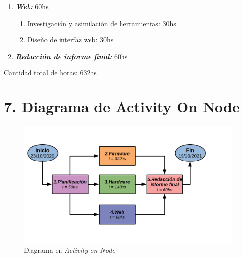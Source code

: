 \documentclass[11pt]{charter}
\begin{document}
\begin{enumerate}
	 \item \textbf{\textit{Web:}} 60hs
	 \begin{enumerate}
	 	\item Investigación y asimilación de herramientas: 30hs
	 	\item Diseño de interfaz web: 30hs
	 \end{enumerate}
	 
	 \item \textbf{\textit{Redacción de informe final:}} 60hs
\end{enumerate}

Cantidad total de horas: 632hs

\clearpage

\section{7. Diagrama de Activity On Node}
\label{sec:AoN}



\begin{figure}[htpb]
\centering 
\includegraphics[width=\textwidth]{./Figuras/activityOnNode.png}
\caption{Diagrama en \textit{Activity on Node}}
\label{fig:AoN}
\end{figure}


\end{document}
